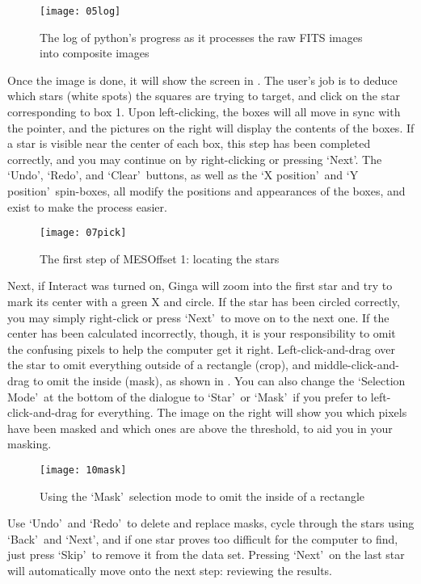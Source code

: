 \documentclass[10pt]{article}
\begin{document}
\begin{figure}[!ht]
	\centering
	\texttt{[image: 05log]}
	\caption{The log of python's progress as it processes the raw FITS images into composite images}
 	\label{fig:log}
\end{figure}

Once the image is done, it will show the screen in . The user's job is to deduce which stars (white spots) the squares are trying to target, and click on the star corresponding to box 1. Upon left-clicking, the boxes will all move in sync with the pointer, and the pictures on the right will display the contents of the boxes. If a star is visible near the center of each box, this step has been completed correctly, and you may continue on by right-clicking or pressing \lq Next\rq. The \lq Undo\rq, \lq Redo\rq, and \lq Clear\rq\ buttons, as well as the \lq X position\rq\ and \lq Y position\rq\ spin-boxes, all modify the positions and appearances of the boxes, and exist to make the process easier.

\begin{figure}[!ht]
	\centering
	\texttt{[image: 07pick]}
	\caption{The first step of MESOffset 1: locating the stars}
 	\label{fig:pick}
\end{figure}

Next, if Interact was turned on, Ginga will zoom into the first star and try to mark its center with a green X and circle. If the star has been circled correctly, you may simply right-click or press \lq Next\rq\ to move on to the next one. If the center has been calculated incorrectly, though, it is your responsibility to omit the confusing pixels to help the computer get it right. Left-click-and-drag over the star to omit everything outside of a rectangle (crop), and middle-click-and-drag to omit the inside (mask), as shown in . You can also change the \lq Selection Mode\rq\ at the bottom of the dialogue to \lq Star\rq\ or \lq Mask\rq\ if you prefer to left-click-and-drag for everything. The image on the right will show you which pixels have been masked and which ones are above the threshold, to aid you in your masking.

\begin{figure}[!ht]
	\centering
	\texttt{[image: 10mask]}
	\caption{Using the \lq Mask\rq\ selection mode to omit the inside of a rectangle}
 	\label{fig:mask}
\end{figure}

Use \lq Undo\rq\ and \lq Redo\rq\ to delete and replace masks, cycle through the stars using \lq Back\rq\ and \lq Next\rq, and if one star proves too difficult for the computer to find, just press \lq Skip\rq\ to remove it from the data set. Pressing \lq Next\rq\ on the last star will automatically move onto the next step: reviewing the results.
\end{document}

